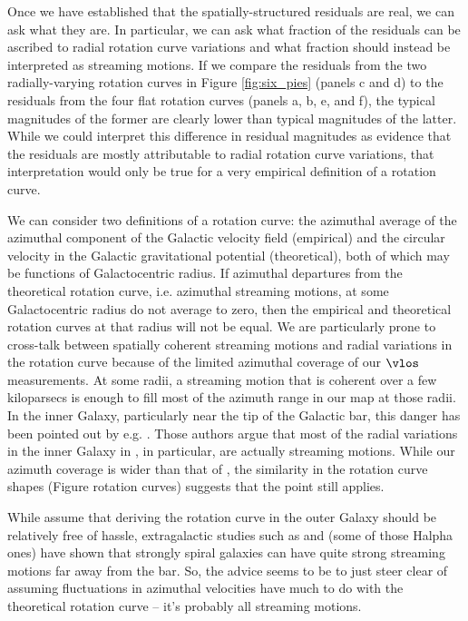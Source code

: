 Once we have established that the spatially-structured residuals are real, we can ask what they are.
In particular, we can ask what fraction of the residuals can be ascribed to radial rotation curve variations and what fraction should instead be interpreted as streaming motions. 
If we compare the residuals from the two radially-varying rotation curves in Figure \ref{fig:six_pies} (panels c and d) to the residuals from the four flat rotation curves (panels a, b, e, and f), the typical magnitudes of the former are clearly lower than typical magnitudes of the latter. 
While we could interpret this difference in residual magnitudes as evidence that the residuals are mostly attributable to radial rotation curve variations, that interpretation would only be true for a very empirical definition of a rotation curve.

We can consider two definitions of a rotation curve: the azimuthal average of the azimuthal component of the Galactic velocity field (empirical) and the circular velocity in the Galactic gravitational potential (theoretical), both of which may be functions of Galactocentric radius. 
If azimuthal departures from the theoretical rotation curve, i.e. azimuthal streaming motions, at some Galactocentric radius do not average to zero, then the empirical and theoretical rotation curves at that radius will not be equal. 
We are particularly prone to cross-talk between spatially coherent streaming motions and radial variations in the rotation curve because of the limited azimuthal coverage of our $\vlos$ measurements.
At some radii, a streaming motion that is coherent over a few kiloparsecs is enough to fill most of the azimuth range in our map at those radii. 
In the inner Galaxy, particularly near the tip of the Galactic bar, this danger has been pointed out by e.g. \citet{Chemin_2015}.
Those authors argue that most of the radial variations in the inner Galaxy in \Clemens, in particular, are actually streaming motions.
While our azimuth coverage is wider than that of \Clemens, the similarity in the rotation curve shapes (Figure rotation curves) suggests that the point still applies.

While \citet{Chemin_2015} assume that deriving the rotation curve in the outer Galaxy should be relatively free of hassle, extragalactic studies such as \citet{Meidt_2013} and (some of those Halpha ones) have shown that strongly spiral galaxies can have quite strong streaming motions far away from the bar. 
So, the advice seems to be to just steer clear of assuming fluctuations in azimuthal velocities have much to do with the theoretical rotation curve -- it's probably all streaming motions. 